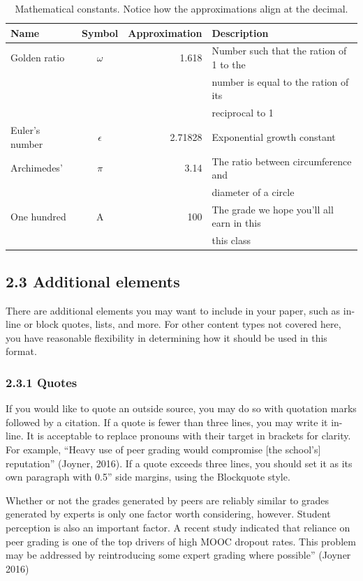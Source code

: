{{{{\begin{table}[H]
  \centering
  \caption{Mathematical constants. Notice how the approximations align at the decimal.}
  \label{table:1}
  \footnotesize
  \begin{tabular}{l|c|r|l}
    \textbf{Name} & \textbf{Symbol} & \textbf{Approximation} & \textbf{Description}\\
    \hline
    Golden ratio & $\omega$ & 1.618 & Number such that the ration of 1 to the\\
    & & & number is equal to the ration of its\\
    & & & reciprocal to 1\\
    \hline
    Euler's number & $\epsilon$ & 2.71828 & Exponential growth constant\\
    \hline
    Archimedes' & $\pi$ & 3.14 & The ratio between circumference and\\
    & & & diameter of a circle\\
    \hline
    One hundred & A\super{+} & 100 & The grade we hope you'll all earn in this\\
    & & & this class
  \end{tabular}
\end{table}

\subsection*{2.3 Additional elements}
There are additional elements you may want to include in your paper, such as in-line or block quotes, lists, and more. For other content types not covered here, you have reasonable flexibility in determining how it should be used in this format.

\subsubsection*{2.3.1 Quotes}
If you would like to quote an outside source, you may do so with quotation marks followed by a citation. If a quote is fewer than three lines, you may write it in-line. It is acceptable to replace pronouns with their target in brackets for clarity. For example, “Heavy use of peer grading would compromise [the school’s] reputation” (Joyner, 2016). If a quote exceeds three lines, you should set it as its own paragraph with 0.5'' side margins, using the Blockquote style.

\begin{quoting}
Whether or not the grades generated by peers are reliably similar to grades
generated by experts is only one factor worth considering, however. Student
perception is also an important factor. A recent study indicated that reliance
on peer grading is one of the top drivers of high MOOC dropout rates. This
problem may be addressed by reintroducing some expert grading where possible''
(Joyner 2016)
\end{quoting}

}}}}
